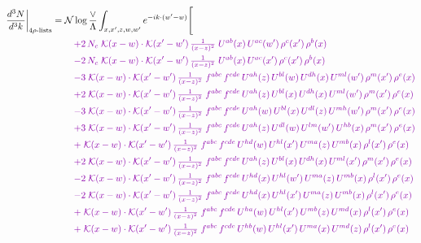 \documentclass[10pt]{article}
\numberwithin{equation}{section}
\newcommand{\NN}{\mathcal N\log\frac{\vee}{\Lambda}}
\begin{document}
\begin{align}
\frac{d^3N}{d^3k}\bigg|_{4\rho\text{-lists}}={}&\NN\int_{x,x',z,w,w'}e^{-ik\cdot(w'-w)}\Bigg[\notag\\
&\quad{\color{CC}+2\,N_c\;\mathcal{K}(x-w)\cdot\mathcal{K}(x'-w')\,\tfrac{1}{(x-z)^{2}}\;U^{ab}(x)\,U^{ac}(w')\,\rho^{c}(x')\,\rho^{b}(x)}\notag\\
&\quad{\color{CC}-2\,N_c\;\mathcal{K}(x-w)\cdot\mathcal{K}(x'-w')\,\tfrac{1}{(x-z)^{2}}\;U^{ab}(x)\,U^{ac}(x')\,\rho^{c}(x')\,\rho^{b}(x)}\notag\\
&\quad{\color{CC}-3\;\mathcal{K}(x-w)\cdot\mathcal{K}(x'-w')\,\tfrac{1}{(x-z)^{2}}\;f^{abc}\,f^{cde}\,U^{ah}(z)\,U^{bl}(w)\,U^{dh}(x)\,U^{ml}(w')\,\rho^{m}(x')\,\rho^{e}(x)}\notag\\
&\quad{\color{CC}+2\;\mathcal{K}(x-w)\cdot\mathcal{K}(x'-w')\,\tfrac{1}{(x-z)^{2}}\;f^{abc}\,f^{cde}\,U^{ah}(z)\,U^{bl}(x)\,U^{dh}(x)\,U^{ml}(w')\,\rho^{m}(x')\,\rho^{e}(x)}\notag\\
&\quad{\color{CC}-3\;\mathcal{K}(x-w)\cdot\mathcal{K}(x'-w')\,\tfrac{1}{(x-z)^{2}}\;f^{abc}\,f^{cde}\,U^{ah}(w)\,U^{bl}(x)\,U^{dl}(z)\,U^{mh}(w')\,\rho^{m}(x')\,\rho^{e}(x)}\notag\\
&\quad{\color{CC}+3\;\mathcal{K}(x-w)\cdot\mathcal{K}(x'-w')\,\tfrac{1}{(x-z)^{2}}\;f^{abc}\,f^{cde}\,U^{ah}(z)\,U^{dl}(w)\,U^{lm}(w')\,U^{hb}(x)\,\rho^{m}(x')\,\rho^{e}(x)}\notag\\
&\quad{\color{CC}+\;\mathcal{K}(x-w)\cdot\mathcal{K}(x'-w')\,\tfrac{1}{(x-z)^{2}}\;f^{abc}\,f^{cde}\,U^{hd}(w)\,U^{hl}(x')\,U^{ma}(z)\,U^{mb}(x)\,\rho^{l}(x')\,\rho^{e}(x)}\notag\\
&\quad{\color{CC}+2\;\mathcal{K}(x-w)\cdot\mathcal{K}(x'-w')\,\tfrac{1}{(x-z)^{2}}\;f^{abc}\,f^{cde}\,U^{ah}(z)\,U^{bl}(x)\,U^{dh}(x)\,U^{ml}(x')\,\rho^{m}(x')\,\rho^{e}(x)}\notag\\
&\quad{\color{CC}-2\;\mathcal{K}(x-w)\cdot\mathcal{K}(x'-w')\,\tfrac{1}{(x-z)^{2}}\;f^{abc}\,f^{cde}\,U^{hd}(x)\,U^{hl}(w')\,U^{ma}(z)\,U^{mb}(x)\,\rho^{l}(x')\,\rho^{e}(x)}\notag\\
&\quad{\color{CC}-2\;\mathcal{K}(x-w)\cdot\mathcal{K}(x'-w')\,\tfrac{1}{(x-z)^{2}}\;f^{abc}\,f^{cde}\,U^{hd}(x)\,U^{hl}(x')\,U^{ma}(z)\,U^{mb}(x)\,\rho^{l}(x')\,\rho^{e}(x)}\notag\\
&\quad{\color{CC}+\;\mathcal{K}(x-w)\cdot\mathcal{K}(x'-w')\,\tfrac{1}{(x-z)^{2}}\;f^{abc}\,f^{cde}\,U^{ha}(w)\,U^{hl}(x')\,U^{mb}(z)\,U^{md}(x)\,\rho^{l}(x')\,\rho^{e}(x)}\notag\\
&\quad{\color{CC}+\;\mathcal{K}(x-w)\cdot\mathcal{K}(x'-w')\,\tfrac{1}{(x-z)^{2}}\;f^{abc}\,f^{cde}\,U^{hb}(w)\,U^{hl}(x')\,U^{ma}(x)\,U^{md}(z)\,\rho^{l}(x')\,\rho^{e}(x)}\notag\\

\end{align}
\end{document}
